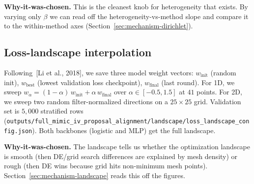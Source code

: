 \textbf{Why-it-was-chosen.} This is the cleanest knob for heterogeneity that
exists. By varying only $\beta$ we can read off the heterogeneity-vs-method
slope and compare it to the within-method axes (Section~\ref{sec:mechanism-dirichlet}).

\subsection{Loss-landscape interpolation}
Following~[Li et al., 2018], we save three model weight vectors:
$w_{\text{init}}$ (random init), $w_{\text{best}}$ (lowest validation loss
checkpoint), $w_{\text{final}}$ (last round). For 1D, we sweep
$w_\alpha = (1-\alpha)\, w_{\text{init}} + \alpha\, w_{\text{final}}$ over
$\alpha \in [-0.5, 1.5]$ at $41$ points. For 2D, we sweep two random
filter-normalized directions on a $25\!\times\!25$ grid. Validation set is
$5{,}000$ stratified rows
(\texttt{outputs/full\_mimic\_iv\_proposal\_alignment/landscape/loss\_landscape\_config.json}).
Both backbones (logistic and MLP) get the full landscape.

\textbf{Why-it-was-chosen.} The landscape tells us whether the optimization
landscape is smooth (then DE/grid search differences are explained by mesh
density) or rough (then DE wins because grid hits non-minimum mesh points).
Section~\ref{sec:mechanism-landscape} reads this off the figures.
